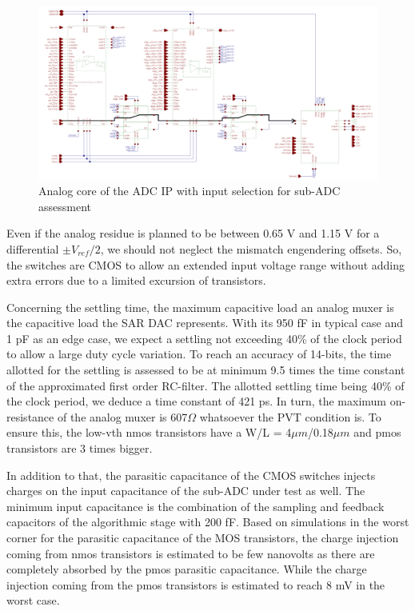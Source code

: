 \begin{figure}[htp]
    \centering
    \includegraphics[width=\textwidth]{Chapter5/Figs/adc_chip/adc-with-test-signal-path.png}
    \caption{Analog core of the ADC IP with input selection for sub-ADC assessment}
    \label{fig:adc-with-test}
\end{figure}

Even if the analog residue is planned to be between 0.65 V and 1.15 V for a differential $\pm V_{ref}/2$, we should not neglect the mismatch engendering offsets. So, the switches are CMOS to allow an extended input voltage range without adding extra errors due to a limited excursion of transistors.

Concerning the settling time, the maximum capacitive load an analog muxer is the capacitive load the SAR DAC represents. With its 950 fF in typical case and 1 pF as an edge case, we expect a settling not exceeding 40\% of the clock period to allow a large duty cycle variation. To reach an accuracy of 14-bits, the time allotted for the settling is assessed to be at minimum 9.5 times the time constant of the approximated first order RC-filter. The allotted settling time being 40\% of the clock period, we deduce a time constant of 421 ps. In turn, the maximum on-resistance of the analog muxer is 607$\Omega$ whatsoever the PVT condition is. To ensure this, the low-vth nmos transistors have a W/L = 4$\mu m$/0.18$\mu m$ and pmos transistors are 3 times bigger.
    
In addition to that, the parasitic capacitance of the CMOS switches injects charges on the input capacitance of the sub-ADC under test as well. The minimum input capacitance is the combination of the sampling and feedback capacitors of the algorithmic stage with 200 fF. Based on simulations in the worst corner for the parasitic capacitance of the MOS transistors, the charge injection coming from nmos transistors is estimated to be few nanovolts as there are completely absorbed by the pmos parasitic capacitance. While the charge injection coming from the pmos transistors is estimated to reach 8 mV in the worst case. 

